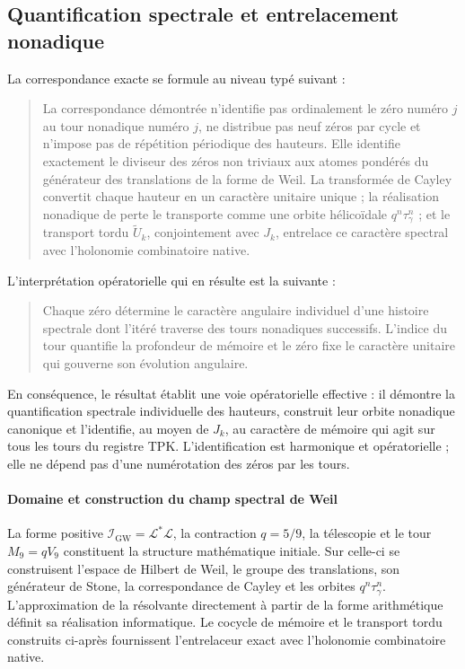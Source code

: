 \subsection{Quantification spectrale et entrelacement nonadique}
La correspondance exacte se formule au niveau typé suivant :\par
\begin{quote}
La correspondance démontrée n'identifie pas ordinalement le zéro numéro \(j\) au tour nonadique numéro \(j\), ne distribue pas neuf zéros par cycle et n'impose pas de répétition périodique des hauteurs. Elle identifie exactement le diviseur des zéros non triviaux aux atomes pondérés du générateur des translations de la forme de Weil. La transformée de Cayley convertit chaque hauteur en un caractère unitaire unique ; la réalisation nonadique de perte le transporte comme une orbite hélicoïdale \(q^n\tau_\gamma^n\) ; et le transport tordu \(\widetilde U_k\), conjointement avec \(J_k\), entrelace ce caractère spectral avec l'holonomie combinatoire native.\par
\end{quote}
L'interprétation opératorielle qui en résulte est la suivante :\par
\begin{quote}
Chaque zéro détermine le caractère angulaire individuel d'une histoire spectrale dont l'itéré traverse des tours nonadiques successifs. L'indice du tour quantifie la profondeur de mémoire et le zéro fixe le caractère unitaire qui gouverne son évolution angulaire.\par
\end{quote}
En conséquence, le résultat établit une voie opératorielle effective : il démontre la quantification spectrale individuelle des hauteurs, construit leur orbite nonadique canonique et l'identifie, au moyen de \(J_k\), au caractère de mémoire qui agit sur tous les tours du registre TPK. L'identification est harmonique et opératorielle ; elle ne dépend pas d'une numérotation des zéros par les tours.\par
\paragraph{Domaine et construction du champ spectral de Weil}
La forme positive \(\mathscr I_{\mathrm{GW}}=\mathscr L^*\mathscr L\), la contraction \(q=5/9\), la télescopie et le tour \(M_9=qV_9\) constituent la structure mathématique initiale. Sur celle-ci se construisent l'espace de Hilbert de Weil, le groupe des translations, son générateur de Stone, la correspondance de Cayley et les orbites \(q^n\tau_\gamma^n\). L'approximation de la résolvante directement à partir de la forme arithmétique définit sa réalisation informatique. Le cocycle de mémoire et le transport tordu construits ci-après fournissent l'entrelaceur exact avec l'holonomie combinatoire native.

